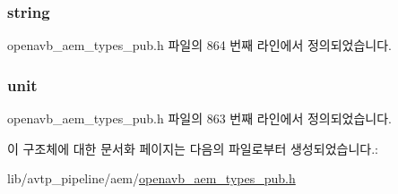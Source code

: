 \subsubsection[{\texorpdfstring{string}{string}}]{ string}\hypertarget{structopenavb__aem__control__value__format__control__linear__double__t_a1f81001cefa769cb3651172fd5ab0748}{}\label{structopenavb__aem__control__value__format__control__linear__double__t_a1f81001cefa769cb3651172fd5ab0748}


openavb\+\_\+aem\+\_\+types\+\_\+pub.\+h 파일의 864 번째 라인에서 정의되었습니다.

\subsubsection[{\texorpdfstring{unit}{unit}}]{ unit}\hypertarget{structopenavb__aem__control__value__format__control__linear__double__t_a0b3ff376c10369016824076deacc055e}{}\label{structopenavb__aem__control__value__format__control__linear__double__t_a0b3ff376c10369016824076deacc055e}


openavb\+\_\+aem\+\_\+types\+\_\+pub.\+h 파일의 863 번째 라인에서 정의되었습니다.



이 구조체에 대한 문서화 페이지는 다음의 파일로부터 생성되었습니다.\+:\begin{DoxyCompactItemize}
\item 
lib/avtp\+\_\+pipeline/aem/\hyperlink{openavb__aem__types__pub_8h}{openavb\+\_\+aem\+\_\+types\+\_\+pub.\+h}\end{DoxyCompactItemize}
